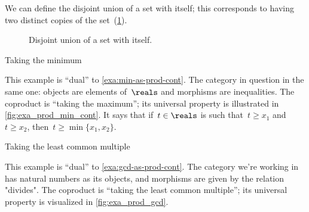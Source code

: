 We can define the disjoint union of a set with itself; this corresponds to having two distinct copies of the set~(\cref{fig:disjointself}).

\begin{figure}[h!]
    \centering
    \caption{Disjoint union of a set with itself.}
    \label{fig:disjointself}
\end{figure}

\begin{marginfigure}
    \centering
    \caption{Taking the minimum}
    \label{fig:exa_coprod_max_cont}
\end{marginfigure}
\begin{example}
    \label{exa:min-as-prod-cont-to-rename}
    This example is ``dual'' to \cref{exa:min-as-prod-cont}.
    The category in question in the same one: objects are elements of~$\reals$ and morphisms are inequalities.
    The coproduct is ``taking the maximum''; its universal property is illustrated in \cref{fig:exa_prod_min_cont}.
    It says that if~$t \in \reals$ is such that~$t \geq x_1$ and $t \geq x_2$, then~$t \geq \min \{ x_1, x_2 \}$.

\end{example}

\begin{marginfigure}
    \centering
    \caption{Taking the least common multiple}
    \label{fig:exa_coprod_lcm_cont}
\end{marginfigure}
\begin{example}
    \label{exa:lcm-as-coprod-cont}
    This example is ``dual'' to \cref{exa:gcd-as-prod-cont}.
    The category we're working in has natural numbers as its objects, and morphisms are given by the relation "divides".
    The coproduct is ``taking the least common multiple''; its universal property is visualized in \cref{fig:exa_prod_gcd}.
\end{example}

